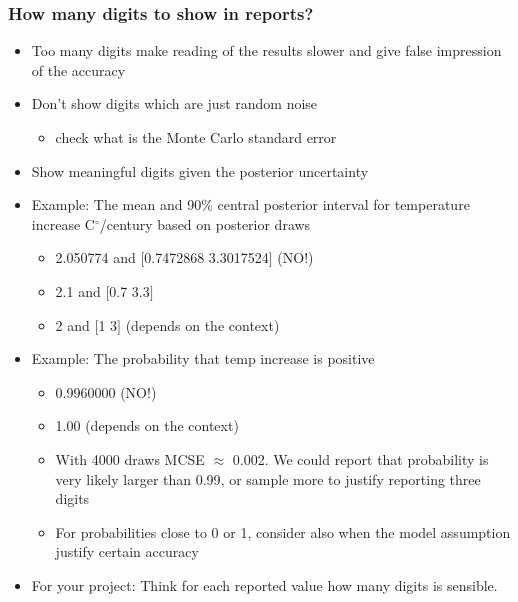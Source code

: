 \documentclass[10pt]{beamer}
\begin{document}
\begin{frame}
\end{frame}

\begin{frame}

\frametitle{How many digits to show in reports?}


  \begin{itemize}
  \item Too many digits make reading of the results slower and give
    false impression of the accuracy
  \item<2-> Don't show digits which are just random noise
    \begin{itemize}
    \item check what is the Monte Carlo standard error
    \end{itemize}
  \item<3-> Show meaningful digits given the posterior uncertainty
  \item<4-> Example: The mean and 90\% central posterior interval for temperature
     increase C$^\circ$/century based on posterior draws
     \begin{itemize}
     \item<5-> {\color{red} 2.050774 and $[$0.7472868 3.3017524$]$} (NO!)
     \item<6-> {\color{uured} 2.1 and $[$0.7 3.3$]$}
    \item<7-> {\color{uured} 2 and $[$1 3$]$} (depends on the context)
     \end{itemize}
   \item<8-> Example: The probability that temp increase is
     positive
     \begin{itemize}
     \item<9-> {\color{red} 0.9960000} (NO!)
     \item<10-> {\color{uured} 1.00} (depends on the context)
     \item<11-> With 4000 draws MCSE $\approx$ 0.002. We could report
       that probability is {\color{uured} very likely larger than 0.99}, or sample
       more to justify reporting three digits
     \item<12-> For probabilities close to 0 or 1, consider also when
       the model assumption justify certain accuracy
     \end{itemize}
   \item<12-> For your project: Think for each reported value how many digits is sensible.
  \end{itemize}

\end{frame}
\end{document}
